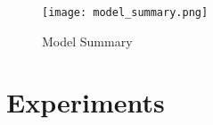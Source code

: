 \documentclass{article}
\begin{document}
\begin{figure} [htp]
    \centering
    \texttt{[image: model\_summary.png]}
    \caption{Model Summary}
    \label{fig:model summary}
\end{figure}


\section{Experiments}
\label{sec:expts}



\end{document}

